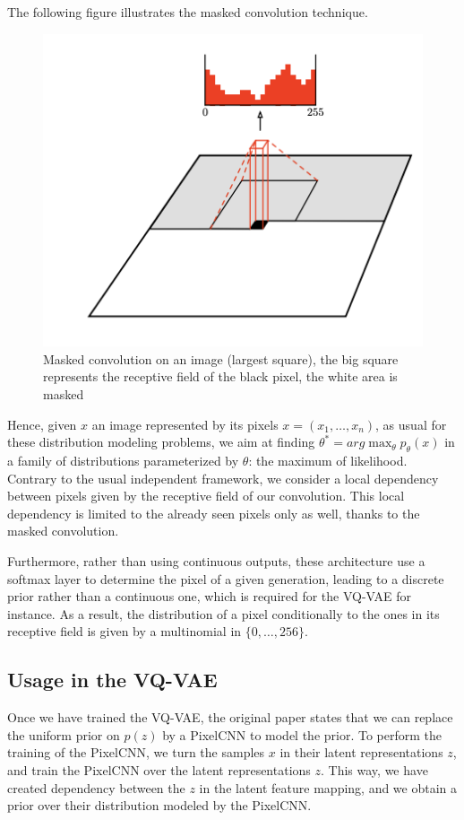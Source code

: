 The following figure illustrates the masked convolution technique.
\begin{figure}[H]
    \center
    \includegraphics[scale=0.9]{images/masked_convolution_pixel_cnn}
    \caption{Masked convolution on an image (largest square), the big square represents the receptive field of the black pixel, the white area is masked}
    \label{fig:masked_convolution_pixel_cnn}
\end{figure}

Hence, given $x$ an image represented by its pixels $x = (x_1, \dots, x_n)$, as usual for these distribution modeling problems, we aim at finding $\theta^* = arg\max_{\theta} p_{\theta}(x)$ in a family of distributions parameterized by $\theta$: the maximum of likelihood.
Contrary to the usual independent framework, we consider a local dependency between pixels given by the receptive field of our convolution.
This local dependency is limited to the already seen pixels only as well, thanks to the masked convolution.
\medskip

Furthermore, rather than using continuous outputs, these architecture use a softmax layer to determine the pixel of a given generation,
leading to a discrete prior rather than a continuous one, which is required for the VQ-VAE for instance.
As a result, the distribution of a pixel conditionally to the ones in its receptive field is given by a multinomial in $\{0, \dots, 256\}$.
\medskip

\subsection{Usage in the VQ-VAE}

Once we have trained the VQ-VAE, the original paper states that we can replace the uniform prior on $p(z)$ by a PixelCNN to model the prior.
To perform the training of the PixelCNN, we turn the samples $x$ in their latent representations $z$, and train the PixelCNN over the latent representations $z$.
This way, we have created dependency between the $z$ in the latent feature mapping, and we obtain a prior over their distribution modeled by the PixelCNN.

